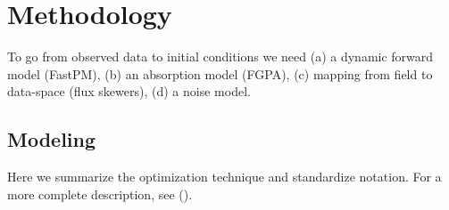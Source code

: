 \documentclass[usenatbib,onecolumn]{mnras}
\begin{document}
\section{Methodology}
\label{sec:method}
To go from observed data to initial conditions we need (a) a dynamic forward model (FastPM), (b) an absorption model (FGPA), (c) mapping from field to data-space (flux skewers), (d) a noise model.

\subsection{Modeling}

Here we summarize the optimization technique and standardize notation. For a more complete description, see (\cite{seljak1998cosmography,2009simon,seljak2017towards,2018Horowitz}).
\end{document}
